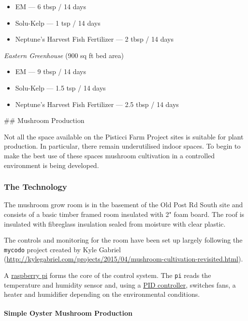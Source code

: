 \begin{itemize}
\itemsep1pt\parskip0pt
\item
  EM --- 6 tbsp / 14 days
\item
  Solu-Kelp --- 1 tsp / 14 days
\item
  Neptune's Harvest Fish Fertilizer --- 2 tbsp / 14 days
\end{itemize}

\emph{Eastern Greenhouse} (900 sq ft bed area)

\begin{itemize}
\itemsep1pt\parskip0pt
\item
  EM --- 9 tbsp / 14 days
\item
  Solu-Kelp --- 1.5 tsp / 14 days
\item
  Neptune's Harvest Fish Fertilizer --- 2.5 tbsp / 14 days
\end{itemize}

 \#\# Mushroom Production

Not all the space available on the Pisticci Farm Project sites is
suitable for plant production. In particular, there remain underutilised
indoor spaces. To begin to make the best use of these spaces mushroom
cultivation in a controlled environment is being developed.

\subsubsection{The Technology}\label{the-technology}

The mushroom grow room is in the basement of the Old Post Rd South site
and consists of a basic timber framed room insulated with 2" foam board.
The roof is insulated with fibreglass insulation sealed from moisture
with clear plastic.

The controls and monitoring for the room have been set up largely
following the \texttt{mycodo} project created by Kyle Gabriel
(\url{http://kylegabriel.com/projects/2015/04/mushroom-cultivation-revisited.html}).

A
\href{https://www.raspberrypi.org/products/raspberry-pi-2-model-b/}{raspberry
pi} forms the core of the control system. The \texttt{pi} reads the
temperature and humidity sensor and, using a
\href{http://www.csimn.com/CSI_pages/PIDforDummies.html}{PID
controller}, switches fans, a heater and humidifier depending on the
environmental conditions.

\paragraph{Simple Oyster Mushroom
Production}\label{simple-oyster-mushroom-production}

